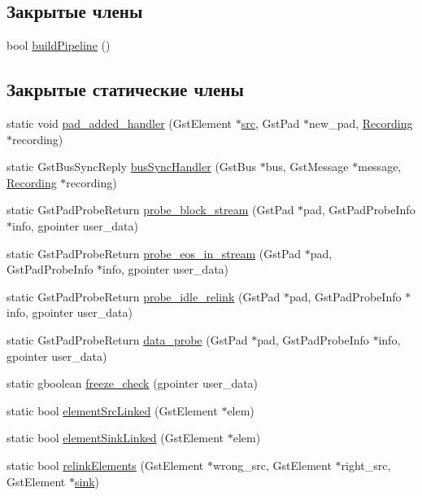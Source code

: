 \subsection*{Закрытые члены}
\begin{DoxyCompactItemize}
\item 
bool \hyperlink{class_recording_a6fcee36a2d8276d6b7bc111800f41c49}{build\+Pipeline} ()
\end{DoxyCompactItemize}
\subsection*{Закрытые статические члены}
\begin{DoxyCompactItemize}
\item 
static void \hyperlink{class_recording_abea9877130d33f18639df0544497d473}{pad\+\_\+added\+\_\+handler} (Gst\+Element $\ast$\hyperlink{class_recording_ac8a63197a7a9f24e6af9d204c351d9ab}{src}, Gst\+Pad $\ast$new\+\_\+pad, \hyperlink{class_recording}{Recording} $\ast$recording)
\item 
static Gst\+Bus\+Sync\+Reply \hyperlink{class_recording_a902cb9d3bacaaf992e38427bbe63319b}{bus\+Sync\+Handler} (Gst\+Bus $\ast$bus, Gst\+Message $\ast$message, \hyperlink{class_recording}{Recording} $\ast$recording)
\item 
static Gst\+Pad\+Probe\+Return \hyperlink{class_recording_a60c63e897855daf4532e7a03c8a37026}{probe\+\_\+block\+\_\+stream} (Gst\+Pad $\ast$pad, Gst\+Pad\+Probe\+Info $\ast$info, gpointer user\+\_\+data)
\item 
static Gst\+Pad\+Probe\+Return \hyperlink{class_recording_a235992b4e8c358b6a648d84ed1e69969}{probe\+\_\+eos\+\_\+in\+\_\+stream} (Gst\+Pad $\ast$pad, Gst\+Pad\+Probe\+Info $\ast$info, gpointer user\+\_\+data)
\item 
static Gst\+Pad\+Probe\+Return \hyperlink{class_recording_a489e974a8481fdc9b6161c96f59ece8e}{probe\+\_\+idle\+\_\+relink} (Gst\+Pad $\ast$pad, Gst\+Pad\+Probe\+Info $\ast$info, gpointer user\+\_\+data)
\item 
static Gst\+Pad\+Probe\+Return \hyperlink{class_recording_aaff0d133af8cc8bc3f514b7ae85fc99a}{data\+\_\+probe} (Gst\+Pad $\ast$pad, Gst\+Pad\+Probe\+Info $\ast$info, gpointer user\+\_\+data)
\item 
static gboolean \hyperlink{class_recording_aebc44e786341582a88b0d91889110c3c}{freeze\+\_\+check} (gpointer user\+\_\+data)
\item 
static bool \hyperlink{class_recording_ab2a5a4db519db59f6de69699bfe04bc6}{element\+Src\+Linked} (Gst\+Element $\ast$elem)
\item 
static bool \hyperlink{class_recording_ac7f2d0b11324334fe3c54927fae60d9c}{element\+Sink\+Linked} (Gst\+Element $\ast$elem)
\item 
static bool \hyperlink{class_recording_a8cff139562008be79b2368c4a51d6ffe}{relink\+Elements} (Gst\+Element $\ast$wrong\+\_\+src, Gst\+Element $\ast$right\+\_\+src, Gst\+Element $\ast$\hyperlink{class_recording_a006ab2adce4204e46eea916f17b68401}{sink})
\end{DoxyCompactItemize}
